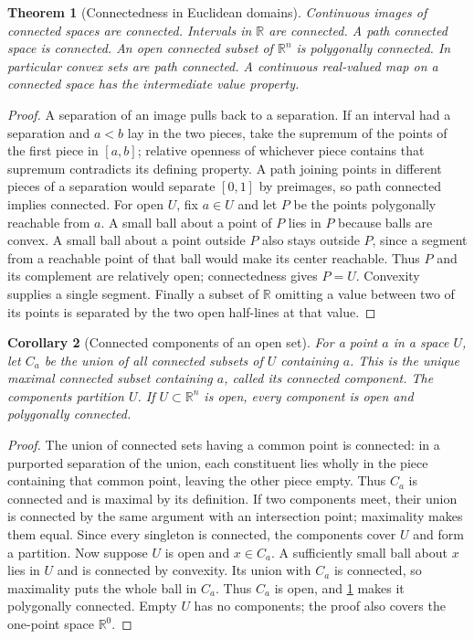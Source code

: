 \documentclass[11pt,oneside,openany]{book}
\newtheorem{theorem}{Theorem}[chapter]
\newtheorem{corollary}[theorem]{Corollary}
\theoremstyle{definition}
\theoremstyle{remark}
\newcommand{\R}{\mathbb R}
\begin{document}
\begin{theorem}[Connectedness in Euclidean domains]\label{d04:01:connectedness}
Continuous images of connected spaces are connected. Intervals in $\R$ are
connected. A path connected space is connected. An open connected subset of
$\R^n$ is polygonally connected. In particular convex sets are path connected.
A continuous real-valued map on a connected space has the intermediate value
property.
\end{theorem}
\begin{proof}
A separation of an image pulls back to a separation. If an interval had a
separation and $a<b$ lay in the two pieces, take the supremum of the points
of the first piece in $[a,b]$; relative openness of whichever piece contains
that supremum contradicts its defining property. A path joining points in
different pieces of a separation would separate $[0,1]$ by preimages, so
path connected implies connected. For open $U$, fix $a\in U$ and let $P$
be the points polygonally reachable from $a$. A small ball about a point of
$P$ lies in $P$ because balls are convex. A small ball about a point outside
$P$ also stays outside $P$, since a segment from a reachable point of that
ball would make its center reachable. Thus $P$ and its complement are
relatively open; connectedness gives $P=U$. Convexity supplies a single
segment. Finally a subset of $\R$ omitting a value between two of its points
is separated by the two open half-lines at that value.
\end{proof}

\begin{corollary}[Connected components of an open set]\label{d04:01:components}
For a point $a$ in a space $U$, let $C_a$ be the union of all connected
subsets of $U$ containing $a$. This is the unique maximal connected subset
containing $a$, called its connected component. The components partition
$U$. If $U\subset\R^n$ is open, every component is open and polygonally
connected.
\end{corollary}
\begin{proof}
The union of connected sets having a common point is connected: in a
purported separation of the union, each constituent lies wholly in the
piece containing that common point, leaving the other piece empty. Thus
$C_a$ is connected and is maximal by its definition. If two components
meet, their union is connected by the same argument with an intersection
point; maximality makes them equal. Since every singleton is connected,
the components cover $U$ and form a partition. Now suppose $U$ is open
and $x\in C_a$. A sufficiently small ball about $x$ lies in $U$ and is
connected by convexity. Its union with $C_a$ is connected, so maximality
puts the whole ball in $C_a$. Thus $C_a$ is open, and
\cref{d04:01:connectedness} makes it polygonally connected. Empty $U$
has no components; the proof also covers the one-point space $\R^0$.
\end{proof}
\end{document}
